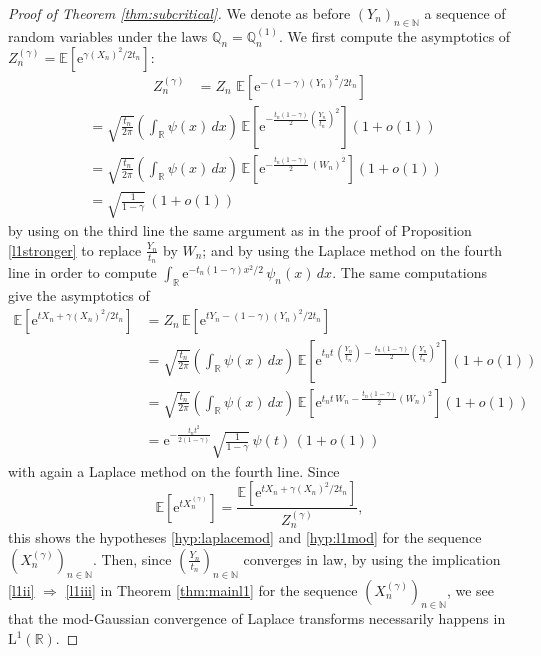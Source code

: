 \documentclass[12pt,a4paper,reqno]{amsart}
\newcommand{\N}{\mathbb{N}}
\newcommand{\R}{\mathbb{R}}
\newcommand{\E}{\mathrm{e}}
\newcommand{\esper}{\mathbb{E}}
\newcommand{\qproba}{\mathbb{Q}}
\theoremstyle{remark}
\begin{document}
\begin{proof}[Proof of Theorem \ref{thm:subcritical}]
We denote as before $(Y_n)_{n \in \N}$ a sequence of random variables under the laws $\qproba_n=\qproba_n^{(1)}$. We first compute the asymptotics of $Z_n^{(\gamma)}=\esper[\E^{\gamma (X_n)^2/2t_n}] $:
\begin{align*}
Z_n^{(\gamma)}&= Z_n\,\,\esper[\E^{-(1-\gamma) (Y_n)^2/2t_n}]\end{align*}
\begin{align*}
&=\sqrt{\frac{t_n}{2\pi}}\left(\int_{\R}\psi(x)\,dx\right)\,\esper\!\left[\E^{-\frac{t_n(1-\gamma)}{2}(\frac{Y_n}{t_n})^2}\right](1+o(1))\\
&=\sqrt{\frac{t_n}{2\pi}}\left(\int_{\R}\psi(x)\,dx\right)\,\esper\!\left[\E^{-\frac{t_n(1-\gamma)}{2}\,(W_n)^2}\right](1+o(1))\\
&=\sqrt{\frac{1}{1-\gamma}}\,(1+o(1))
\end{align*}
by using on the third line the same argument as in the proof of Proposition \ref{l1stronger} to replace $\frac{Y_n}{t_n}$ by $W_n$; and by using the Laplace method on the fourth line in order to compute $\int_{\R} \E^{-t_n(1-\gamma)x^2/2}\,\psi_n(x)\,dx$. The same computations give the asymptotics of
\begin{align*}
\esper[\E^{tX_n+\gamma (X_n)^2/2t_n}]&=Z_n\,\esper[\E^{tY_n-(1-\gamma) (Y_n)^2/2t_n}]\\
&=\sqrt{\frac{t_n}{2\pi}}\left(\int_{\R}\psi(x)\,dx\right)\,\esper\!\left[\E^{t_nt\,(\frac{Y_n}{t_n})-\frac{t_n(1-\gamma)}{2}(\frac{Y_n}{t_n})^2}\right](1+o(1))\\
&=\sqrt{\frac{t_n}{2\pi}}\left(\int_{\R}\psi(x)\,dx\right)\,\esper\!\left[\E^{t_nt \,W_n-\frac{t_n(1-\gamma)}{2}(W_n)^2}\right](1+o(1))\\
&=\E^{-\frac{t_nt^2}{2(1-\gamma)}} \sqrt{\frac{1}{1-\gamma}}\,\psi(t)\,(1+o(1))
\end{align*}
with again a Laplace method on the fourth line. Since
$$\esper[\E^{tX_n^{(\gamma)}}]=\frac{\esper[\E^{tX_n+\gamma (X_n)^2/2t_n}]}{Z_n^{(\gamma)}},$$
this shows the hypotheses \eqref{hyp:laplacemod} and \eqref{hyp:l1mod} for the sequence $(X_n^{(\gamma)})_{n \in \N}$. Then, since $(\frac{Y_n}{t_n})_{n \in \N}$ converges in law, by using the implication \eqref{l1ii} $\Rightarrow$ \eqref{l1iii} in Theorem \ref{thm:mainl1} for the sequence  $(X_n^{(\gamma)})_{n \in \N}$, we see that the mod-Gaussian convergence of Laplace transforms necessarily happens in $\mathrm{L}^1(\R)$.
\end{proof}
\medskip
\end{document}
